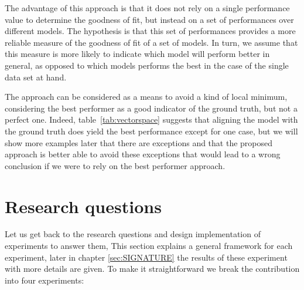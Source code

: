 The advantage of this approach is that it does not rely on a single performance value to determine the goodness of fit, but instead on a set of performances over different models.  The hypothesis is that this set of performances provides a more reliable measure of the goodness of fit of a set of models.  In turn, we assume that this measure is more likely to indicate which model will perform better in general, as opposed to which models performs the best in the case of the single data set at hand.

The approach can be considered as a means to avoid a kind of local minimum, considering the best performer as a good indicator of the ground truth, but not a perfect one. Indeed, table~\ref{tab:vectorspace} suggests that aligning the model with the ground truth does yield the best performance except for one case, but we will show more examples later that there are exceptions and that the proposed approach is better able to avoid these exceptions that would lead to a wrong conclusion if we were to rely on the best performer approach.

\section{Research questions}

Let us get back to the research questions and design implementation of experiments to answer them, This section explains a general framework for each experiment, later in chapter \ref{sec:SIGNATURE} the results of these experiment with more details are given. To make it straightforward we break the contribution into four experiments:

